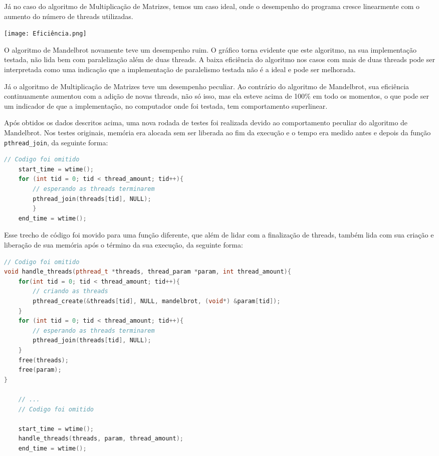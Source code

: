 \documentclass[10pt,a4paper]{article}
\begin{document}
		Já no caso do algoritmo de Multiplicação de Matrizes, temos um caso ideal, onde o desempenho do programa cresce linearmente
		com o aumento do número de threads utilizadas.

		\texttt{[image: Eficiência.png]}
		
		O algoritmo de Mandelbrot novamente teve um desempenho ruim. O gráfico torna evidente
		que este algoritmo, na sua implementação testada, não lida bem com paralelização além de duas threads.
		A baixa eficiência do algoritmo nos casos com mais de duas threads pode ser interpretada como uma indicação que
		a implementação de paralelismo testada não é a ideal e pode ser melhorada.

		Já o algoritmo de Multiplicação de Matrizes teve um desempenho peculiar. Ao contrário do algoritmo de Mandelbrot, sua
		eficiência continuamente aumentou com a adição de novas threads, não só isso, mas ela esteve acima de 100\% em todo os
		momentos, o que pode ser um indicador de que a implementação, no computador onde foi testada, tem comportamento superlinear.

		Após obtidos os dados descritos acima, uma nova rodada de testes foi realizada devido ao comportamento peculiar do algoritmo de 
		Mandelbrot. Nos testes originais, memória era alocada sem ser liberada ao fim da execução e o tempo era medido antes e depois da função
		\texttt{pthread\_join}, da seguinte forma:

		\begin{lstlisting}[language=c++]
	// Codigo foi omitido
	start_time = wtime();
	for (int tid = 0; tid < thread_amount; tid++){
		// esperando as threads terminarem
		pthread_join(threads[tid], NULL);
		}
	end_time = wtime();
		\end{lstlisting}
			
		Esse trecho de código foi movido para uma função diferente, que além de lidar com a finalização de threads, também lida com sua
		criação e liberação de sua memória após o término da sua execução, da seguinte forma:
			
			\begin{adjustwidth}{-1cm}{}
		\begin{lstlisting}[language=c++]
// Codigo foi omitido
void handle_threads(pthread_t *threads, thread_param *param, int thread_amount){
	for(int tid = 0; tid < thread_amount; tid++){
		// criando as threads
		pthread_create(&threads[tid], NULL, mandelbrot, (void*) &param[tid]);
	}
	for (int tid = 0; tid < thread_amount; tid++){
		// esperando as threads terminarem
		pthread_join(threads[tid], NULL);
	}
	free(threads);
	free(param);
}

	// ...
	// Codigo foi omitido

	start_time = wtime();
	handle_threads(threads, param, thread_amount);
	end_time = wtime();
		\end{lstlisting}
			\end{adjustwidth}
\end{document}
